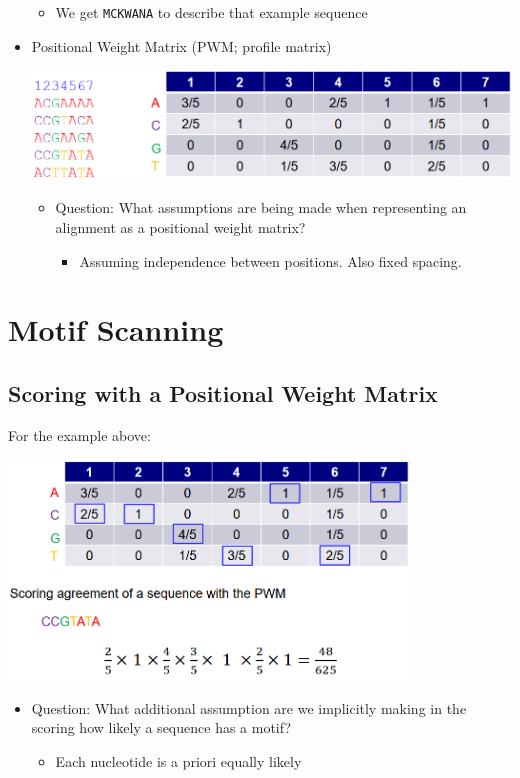 \documentclass[10pt]{article}
\begin{document}
\begin{itemize}
\begin{center}
    \end{center}
    \begin{itemize}
        \item We get \texttt{MCKWANA} to describe that example sequence
    \end{itemize}
    \item Positional Weight Matrix (PWM; profile matrix)
    \begin{center} 
        \includegraphics*[width=\textwidth]{W7_7.png} 
    \end{center}
    \begin{itemize}
        \item Question: What assumptions are being made when representing an alignment as a positional weight matrix?
        \begin{itemize}
            \item Assuming independence between positions.  Also fixed spacing.
        \end{itemize}
    \end{itemize}
\end{itemize}

\section*{Motif Scanning}
\subsection*{Scoring with a Positional Weight Matrix}
For the example above:
\begin{center} 
	\includegraphics*[width=0.8\textwidth]{W7_8.png} 
\end{center}
\begin{itemize}
	\item Question: What additional assumption are we implicitly making in the scoring how likely a sequence has a motif?
	\begin{itemize}
        \item Each nucleotide is a priori equally likely
    \end{itemize}
\end{itemize}
\end{document}
